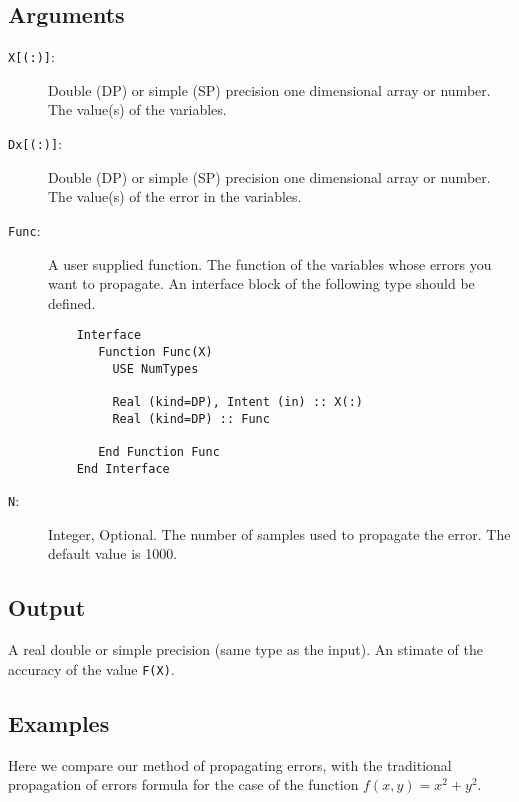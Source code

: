 \subsection{Arguments}

\begin{description}
\item[\texttt{X[(:)]}:] Double (DP) or simple (SP) precision one
  dimensional array or number. The value(s) of the variables.
\item[\texttt{Dx[(:)]}:] Double (DP) or simple (SP) precision one
  dimensional array or number. The value(s) of the error in the
  variables.
\item[\texttt{Func}:] A user supplied function. The function of the
  variables whose errors you want to propagate. An interface block of
  the following type should be defined. 
\begin{verbatim}
    Interface 
       Function Func(X)
         USE NumTypes
         
         Real (kind=DP), Intent (in) :: X(:)
         Real (kind=DP) :: Func

       End Function Func
    End Interface
\end{verbatim}
\item[\texttt{N}:] Integer, Optional. The number of samples used to
  propagate the error. The default value is 1000.
\end{description}

\subsection{Output}

A real double or simple precision (same type as the input). An stimate
of the accuracy of the value \texttt{F(X)}.

\subsection{Examples}

Here we compare our method of propagating errors, with the traditional
propagation of errors formula for the case of the function
$f(x,y)=x^2+y^2$. 

